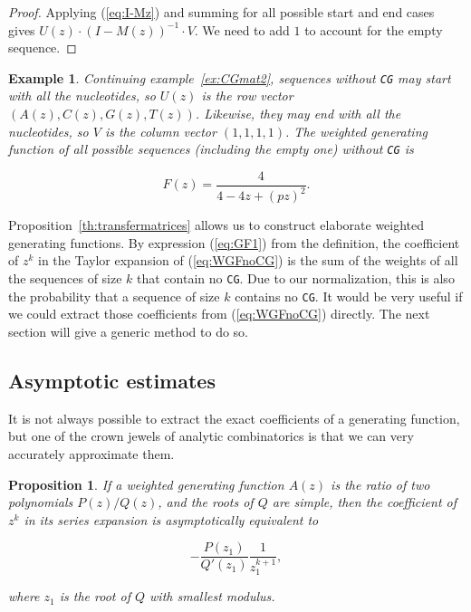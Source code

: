 \documentclass{article}
\newtheorem{example}{Example}
\newtheorem{proposition}{Proposition}
\begin{document}
\begin{proof}
Applying (\ref{eq:I-Mz}) and summing for all possible start and end cases
gives $U(z) \cdot (I-M(z))^{-1} \cdot V$. We need to add $1$ to account
for the empty sequence.
\end{proof}

\begin{example}
Continuing example~\ref{ex:CGmat2}, sequences without \texttt{CG} may
start with all the nucleotides, so $U(z)$ is the row vector $(A(z), C(z),
G(z), T(z))$. Likewise, they may end with all the nucleotides, so $V$ is
the column vector $(1,1,1,1)$. The weighted generating function of all
possible sequences (including the empty one) without \texttt{CG} is

\begin{equation}
\label{eq:WGFnoCG}
F(z) = \frac{4}{4-4z+(pz)^2}.
\end{equation}
\end{example}

Proposition~\ref{th:transfermatrices} allows us to construct
elaborate weighted generating functions. By expression (\ref{eq:GF1}) from
the definition, the coefficient of $z^k$ in the Taylor expansion of
(\ref{eq:WGFnoCG}) is the sum of the weights of all the sequences of size
$k$ that contain no \texttt{CG}. Due to our normalization, this is also
the probability that a sequence of size $k$ contains no \texttt{CG}.
It would be very useful if we could extract those coefficients from
(\ref{eq:WGFnoCG}) directly. The next section will give a generic method
to do so.




\subsection{Asymptotic estimates}

It is not always possible to extract the exact coefficients of a
generating function, but one of the crown jewels of analytic combinatorics
is that we can very accurately approximate them.

\begin{proposition}
\label{th:ass}
If a weighted generating function $A(z)$ is the ratio of two polynomials
$P(z)/Q(z)$, and the roots of $Q$ are simple, then the coefficient of
$z^k$ in its series expansion is asymptotically equivalent to

\begin{equation}
\label{eq:ass}
-\frac{P(z_1)}{Q'(z_1)}\frac{1}{z_1^{k+1}},
\end{equation}

\noindent
where $z_1$ is the root of $Q$ with smallest modulus.
\end{proposition}
\end{document}
